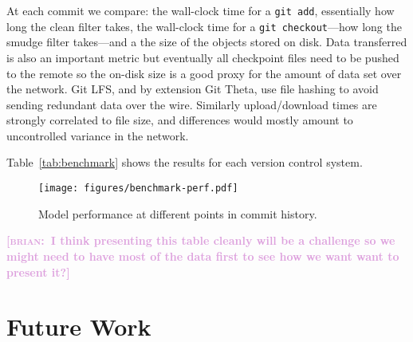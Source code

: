 \documentclass[nohyperref]{article}
\def\code#1{\texttt{#1}}
\theoremstyle{plain}
\theoremstyle{definition}
\theoremstyle{remark}
\newcommand{\brian}[1]{\textcolor{Plum}{\bf\small [\textsc{brian}:~#1]}}
\begin{document}
At each commit we compare: the wall-clock time for a \code{git add}, essentially how long the clean filter takes, the wall-clock time for a \code{git checkout}---how long the smudge filter takes---and a the size of the objects stored on disk. Data transferred is also an important metric but eventually all checkpoint files need to be pushed to the remote so the on-disk size is a good proxy for the amount of data set over the network. Git LFS, and by extension Git Theta, use file hashing to avoid sending redundant data over the wire. Similarly upload/download times are strongly correlated to file size, and differences would mostly amount to uncontrolled variance in the network.

Table~\ref{tab:benchmark} shows the results for each version control system.

\begin{figure}[ht]
\vskip 0.2in
\begin{center}
\centerline{\texttt{[image: figures/benchmark-perf.pdf]}}
\caption{Model performance at different points in commit history.}
\label{fig:perf}
\end{center}
\vskip -0.2in
\end{figure}


\brian{I think presenting this table cleanly will be a challenge so we might need to have most of the data first to see how we want want to present it?}


\section{Future Work}



\end{document}
